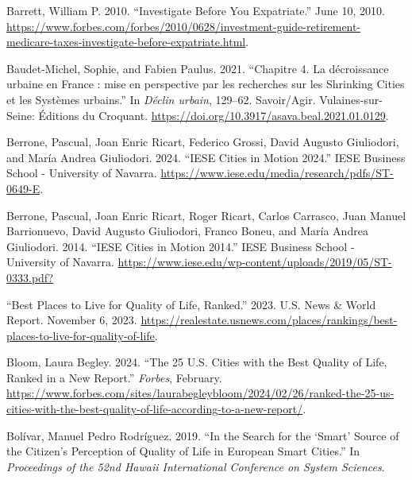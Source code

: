 \documentclass[
  english,
  12pt,
  a4paper,
]{scrartcl}
\newlength{\cslhangindent}
\newenvironment{CSLReferences}[2] %
 {\begin{list}{}{%
  \setlength{\itemindent}{0pt}
  \setlength{\leftmargin}{0pt}
  \setlength{\parsep}{0pt}
  \ifodd #1
   \setlength{\leftmargin}{\cslhangindent}
   \setlength{\itemindent}{-1\cslhangindent}
  \fi
  \setlength{\itemsep}{#2\baselineskip}}}
 {\end{list}}
\begin{document}
\label{refs}
\begin{CSLReferences}{1}{0}
Barrett, William P. 2010. {``Investigate {Before You Expatriate}.''}
June 10, 2010.
\url{https://www.forbes.com/forbes/2010/0628/investment-guide-retirement-medicare-taxes-investigate-before-expatriate.html}.

Baudet-Michel, Sophie, and Fabien Paulus. 2021. {``Chapitre 4. La
décroissance urbaine en France : mise en perspective par les recherches
sur les Shrinking Cities et les Systèmes urbains.''} In \emph{Déclin
urbain}, 129--62. Savoir/Agir. Vulaines-sur-Seine: Éditions du Croquant.
\url{https://doi.org/10.3917/asava.beal.2021.01.0129}.

Berrone, Pascual, Joan Enric Ricart, Federico Grossi, David Augusto
Giuliodori, and María Andrea Giuliodori. 2024. {``{IESE Cities} in
{Motion} 2024.''} IESE Business School - University of Navarra.
\url{https://www.iese.edu/media/research/pdfs/ST-0649-E}.

Berrone, Pascual, Joan Enric Ricart, Roger Ricart, Carlos Carrasco, Juan
Manuel Barrionuevo, David Augusto Giuliodori, Franco Boneu, and María
Andrea Giuliodori. 2014. {``{IESE Cities} in {Motion} 2014.''} IESE
Business School - University of Navarra.
\url{https://www.iese.edu/wp-content/uploads/2019/05/ST-0333.pdf?}

{``Best {Places to Live} for Quality of Life, Ranked.''} 2023. U.S. News
\& World Report. November 6, 2023.
\url{https://realestate.usnews.com/places/rankings/best-places-to-live-for-quality-of-life}.

Bloom, Laura Begley. 2024. {``The 25 {U.S.} Cities with the Best Quality
of Life, Ranked in a New Report.''} \emph{Forbes}, February.
\url{https://www.forbes.com/sites/laurabegleybloom/2024/02/26/ranked-the-25-us-cities-with-the-best-quality-of-life-according-to-a-new-report/}.

Bolívar, Manuel Pedro Rodríguez. 2019. {``In the Search for the
{`{Smart}'} {Source} of the Citizen's Perception of {Quality} of {Life}
in {European Smart Cities}.''} In \emph{Proceedings of the 52nd {Hawaii
International Conference} on {System Sciences}}.


\end{CSLReferences}
\end{document}
